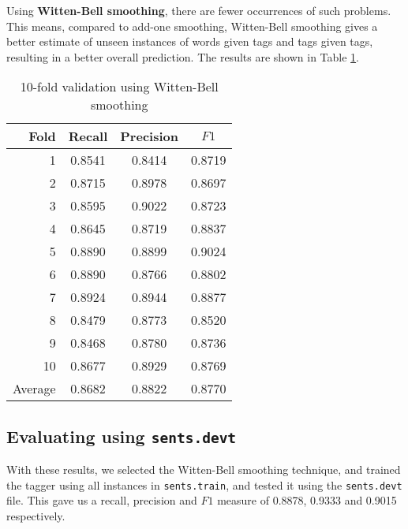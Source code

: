 \documentclass[12pt]{homework}
\begin{document}
Using \textbf{Witten-Bell smoothing}, there are fewer occurrences of such 
problems. This means, compared to add-one smoothing, Witten-Bell smoothing gives 
a better estimate of unseen instances of words given tags and tags given tags, 
resulting in a better overall prediction. The results are shown in Table 
\ref{wbresult}.
\begin{table}
	\begin{center}
	\begin{tabular}{r | c c c}
	\hline
	Fold	&	Recall	&	Precision	&	$F1$ \\
	\hline
	1		&	0.8541	&	0.8414		&	0.8719\\
	2		&	0.8715	&	0.8978		&	0.8697\\
	3		&	0.8595	&	0.9022		&	0.8723\\
	4		&	0.8645	&	0.8719		&	0.8837\\
	5		&	0.8890	&	0.8899		&	0.9024\\
	6		&	0.8890	&	0.8766		&	0.8802\\
	7		&	0.8924	&	0.8944		&	0.8877\\
	8		&	0.8479	&	0.8773		&	0.8520\\
	9		&	0.8468	&	0.8780		&	0.8736\\
	10		&	0.8677	&	0.8929		&	0.8769\\
	\hline
	Average	&	0.8682	&	0.8822		&	0.8770	\\
	\hline
	\end{tabular}

	\end{center}
	\caption{10-fold validation using Witten-Bell smoothing}
	\label{wbresult}
\end{table}
\subsection{Evaluating using \texttt{sents.devt}}

With these results, we selected the Witten-Bell smoothing technique, and trained 
the tagger using all instances in \texttt{sents.train}, and tested it using the 
\texttt{sents.devt} file. This gave us a recall, precision and $F1$ measure of 
0.8878, 0.9333 and 	0.9015 respectively.
\end{document}

